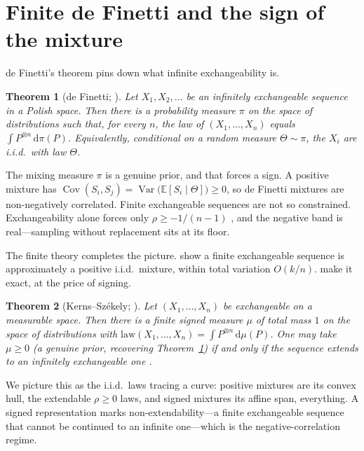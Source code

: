 \documentclass[11pt]{article}
\newtheorem{theorem}{Theorem}
\begin{document}
\section{Finite de Finetti and the sign of the mixture}

de Finetti's theorem pins down what infinite exchangeability is.

\begin{theorem}[de Finetti; \citealp{definetti1937,hewitt1955}]\label{thm:definetti}
Let $X_1,X_2,\dots$ be an infinitely exchangeable sequence in a Polish space. Then there is a
probability measure $\pi$ on the space of distributions such that, for every $n$, the law of
$(X_1,\dots,X_n)$ equals $\int P^{\otimes n}\,\mathrm{d}\pi(P)$. Equivalently, conditional on a
random measure $\Theta\sim\pi$, the $X_i$ are i.i.d.\ with law $\Theta$.
\end{theorem}

The mixing measure $\pi$ is a genuine prior, and that forces a sign. A positive mixture has
$\operatorname{Cov}(S_i,S_j)=\operatorname{Var}\big(\mathbb E[S_i\mid\Theta]\big)\ge 0$, so de
Finetti mixtures are non-negatively correlated. Finite exchangeable sequences are not so
constrained. Exchangeability alone forces only $\rho\ge -1/(n-1)$ \citep{aldous1985}, and the
negative band is real---sampling without replacement sits at its floor.

The finite theory completes the picture. \citet{diaconis1980} show a finite exchangeable
sequence is approximately a positive i.i.d.\ mixture, within total variation $O(k/n)$.
\citet{kerns2006} make it exact, at the price of signing.

\begin{theorem}[Kerns--Sz\'ekely; \citealp{kerns2006}]\label{thm:signed}
Let $(X_1,\dots,X_n)$ be exchangeable on a measurable space. Then there is a finite
signed measure $\mu$ of total mass $1$ on the space of distributions with
$\mathrm{law}(X_1,\dots,X_n)=\int P^{\otimes n}\,\mathrm{d}\mu(P)$. One may take $\mu\ge 0$ (a
genuine prior, recovering Theorem~\ref{thm:definetti}) if and only if the sequence extends to an
infinitely exchangeable one \citep{leonetti2018}.
\end{theorem} We picture this as the i.i.d.\ laws tracing a curve: positive mixtures are its convex hull, the
extendable $\rho\ge 0$ laws, and signed mixtures its affine span, everything. A signed
representation marks non-extendability---a finite exchangeable sequence that cannot be continued
to an infinite one---which is the negative-correlation regime.
\end{document}
